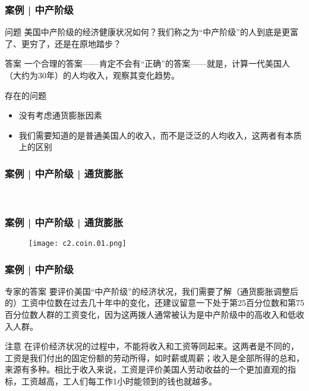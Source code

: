 \begin{frame}
  \frametitle{案例 | 中产阶级}
  \begin{block}{问题}
    美国中产阶级的经济健康状况如何？我们称之为“中产阶级”的人到底是更富了、更穷了，还是在原地踏步？
  \end{block}
  \pause
  \begin{block}{答案}
    一个合理的答案——肯定不会有“正确”的答案——就是，计算一代美国人（大约为30年）的人均收入，观察其变化趋势。
  \end{block}
  \pause
  \begin{block}{存在的问题}
    \begin{itemize}
      \item 没有考虑通货膨胀因素
      \item 我们需要知道的是普通美国人的收入，而不是泛泛的人均收入，这两者有本质上的区别
    \end{itemize}
  \end{block}
\end{frame}

\begin{frame}
  \frametitle{案例 | 中产阶级 | 通货膨胀}
  \begin{figure}
    \centering
    \\
  \end{figure}
\end{frame}

\begin{frame}
  \frametitle{案例 | 中产阶级 | 通货膨胀}
  \begin{figure}
    \centering
    \texttt{[image: c2.coin.01.png]}
  \end{figure}
\end{frame}

\begin{frame}
  \frametitle{案例 | 中产阶级}
  \begin{block}{专家的答案}
    要评价美国“中产阶级”的经济状况，我们需要了解（通货膨胀调整后的）工资中位数在过去几十年中的变化，还建议留意一下处于第25百分位数和第75百分位数人群的工资变化，因为这两拨人通常被认为是中产阶级中的高收入和低收入人群。
  \end{block}
  \pause
  \begin{block}{注意}
    在评价经济状况的过程中，不能将收入和工资等同起来。这两者是不同的，工资是我们付出的固定份额的劳动所得，如时薪或周薪；收入是全部所得的总和，来源有多种。相比于收入来说，工资是评价美国人劳动收益的一个更加直观的指标，工资越高，工人们每工作1小时能领到的钱也就越多。
  \end{block}
\end{frame}

